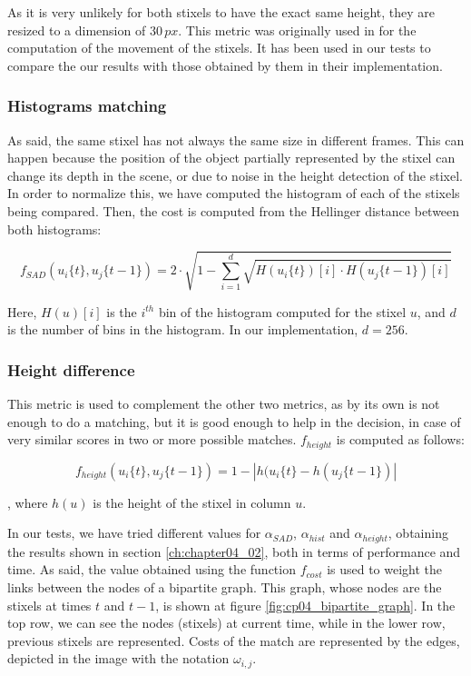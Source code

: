 As it is very unlikely for both stixels to have the exact same height, they are resized to a dimension of $30\,px$. This metric was originally used in \cite{gunyel2012stixels} for the computation of the movement of the stixels. It has been used in our tests to compare the our results with those obtained by them in their implementation.

\subsubsection{Histograms matching}\label{ch:chapter04_01_03_01_02}

As said, the same stixel has not always the same size in different frames. This can happen because the position of the object partially represented by the stixel can change its depth in the scene, or due to noise in the height detection of the stixel. In order to normalize this, we have computed the histogram of each of the stixels being compared. Then, the cost is computed from the Hellinger distance between both histograms:

\begin{equation}\label{eq:cp04_stixel_movement_histograms_cost}
f_{SAD}(u_i\{t\}, u_j\{t - 1\}) = 2 \cdot \sqrt { 1 - \underset{i=1}{\overset{d}{\sum}}\sqrt{H(u_i\{t\})[i] \cdot H(u_j\{t - 1\})[i]}}
\end{equation}

Here, $H(u)[i]$ is the $i^{th}$ bin of the histogram computed for the stixel $u$, and $d$ is the number of bins in the histogram. In our implementation, $d = 256$.

\subsubsection{Height difference}\label{ch:chapter04_01_03_01_05}

This metric is used to complement the other two metrics, as by its own is not enough to do a matching, but it is good enough to help in the decision, in case of very similar scores in two or more possible matches. $f_{height}$ is computed as follows:

\begin{equation}\label{eq:cp04_stixel_movement_height_cost}
f_{height}(u_i\{t\}, u_j\{t - 1\}) = 1 - |h(u_i\{t\} - h(u_j\{t - 1\})|
\end{equation}

, where $h(u)$ is the height of the stixel in column $u$. 

In our tests, we have tried different values for $\alpha_{SAD}$, $\alpha_{hist}$ and $\alpha_{height}$, obtaining the results shown in section \ref{ch:chapter04_02}, both in terms of performance and time. As said, the value obtained using the function $f_{cost}$ is used to weight the links between the nodes of a bipartite graph. This graph, whose nodes are the stixels at times $t$ and $t - 1$, is shown at figure \ref{fig:cp04_bipartite_graph}. In the top row, we can see the nodes (stixels) at current time, while in the lower row, previous stixels are represented. Costs of the match are represented by the edges, depicted in the image with the notation $\omega_{i,j}$.

